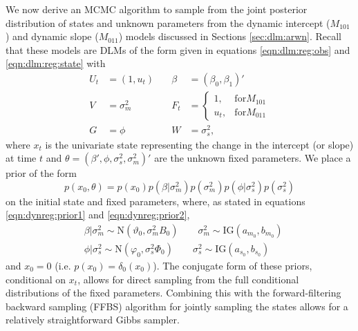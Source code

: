 We now derive an MCMC algorithm to sample from the joint posterior distribution of states and unknown parameters from the dynamic intercept ($M_{101}$) and dynamic slope ($M_{011}$) models discussed in Sections \ref{sec:dlm:arwn}. Recall that these models are DLMs of the form given in equations \eqref{eqn:dlm:reg:obs} and \eqref{eqn:dlm:reg:state} with
\begin{align*}
U_t &= (1, u_t) &\quad \beta &= (\beta_0, \beta_1)' \\
V &= \sigma^2_m &\quad F_t &= \left\{\begin{array}{ll} 1, & \mbox{for} M_{101} \\ u_t, & \mbox{for} M_{011} \end{array}\right. \\
G &= \phi &\quad W &= \sigma^2_s,
\end{align*}
where $x_t$ is the univariate state representing the change in the intercept (or slope) at time $t$ and $\theta = (\beta',\phi,\sigma^2_s,\sigma^2_m)'$ are the unknown fixed parameters. We place a prior of the form
\begin{equation}
p(x_0, \theta) = p(x_0)p(\beta|\sigma^2_m)p(\sigma^2_m)p(\phi|\sigma^2_s)p(\sigma^2_s) \label{eqn:dr:prior}
\end{equation}
on the initial state and fixed parameters, where, as stated in equations \eqref{eqn:dynreg:prior1} and \eqref{eqn:dynreg:prior2},
\begin{align*}
&\beta|\sigma^2_m \sim \mbox{N}(\vartheta_0, \sigma^2_mB_0) \qquad \sigma^2_m \sim \mbox{IG}(a_{m_0}, b_{m_0}) \\
&\phi|\sigma^2_s \sim \mbox{N}(\varphi_0, \sigma^2_s\Phi_0) \qquad \sigma^2_s \sim \mbox{IG}(a_{s_0}, b_{s_0})
\end{align*}
and $x_0 = 0$ (i.e. $p(x_0) = \delta_0(x_0)$). The conjugate form of these priors, conditional on $x_t$, allows for direct sampling from the full conditional distributions of the fixed parameters. Combining this with the forward-filtering backward sampling (FFBS) algorithm for jointly sampling the states \citep{Cart:Kohn:on:1994} allows for a relatively straightforward Gibbs sampler.


